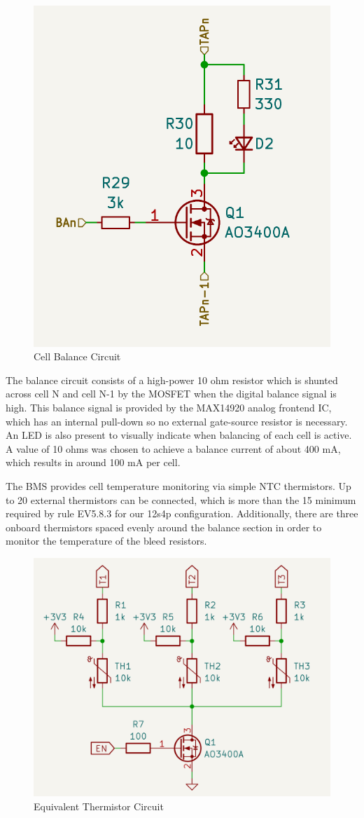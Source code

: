\documentclass[12pt, a4paper]{article}
\begin{document}
\begin{figure}[H]
  \centering
  \includegraphics[width=0.6\linewidth]{balance.png}
  \caption{Cell Balance Circuit}
  \label{fig:bms-balance-circuit}
\end{figure}

The balance circuit consists of a high-power 10 ohm resistor which is shunted across cell N and cell N-1 by the MOSFET when the digital balance signal is high.
This balance signal is provided by the MAX14920 analog frontend IC, which has an internal pull-down so no external gate-source resistor is necessary.
An LED is also present to visually indicate when balancing of each cell is active.
A value of 10 ohms was chosen to achieve a balance current of about 400 mA, which results in around 100 mA per cell.

The BMS provides cell temperature monitoring via simple NTC thermistors.
Up to 20 external thermistors can be connected, which is more than the 15 minimum required by rule EV5.8.3 for our 12s4p configuration.
Additionally, there are three onboard thermistors spaced evenly around the balance section in order to monitor the temperature of the bleed resistors.

\begin{figure}[H]
  \centering
  \includegraphics[width=\linewidth]{thermistor.png}
  \caption{Equivalent Thermistor Circuit}
  \label{fig:bms-thermistor-circuit}
\end{figure}
\end{document}
